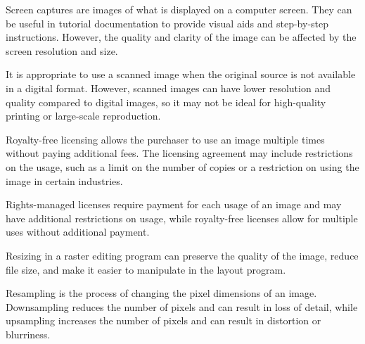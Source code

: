 \documentclass{report}
\begin{document}
    \bigbreak \noindent \bigbreak \noindent 
    \bigbreak \noindent 
    \bigbreak \noindent 
    Screen captures are images of what is displayed on a computer screen. They can be useful in tutorial documentation to provide visual aids and step-by-step instructions. However, the quality and clarity of the image can be affected by the screen resolution and size.

    \bigbreak \noindent \bigbreak \noindent 
    \bigbreak \noindent 
    \bigbreak \noindent 
    It is appropriate to use a scanned image when the original source is not available in a digital format. However, scanned images can have lower resolution and quality compared to digital images, so it may not be ideal for high-quality printing or large-scale reproduction.

    \bigbreak \noindent \bigbreak \noindent 
    \bigbreak \noindent 
    \bigbreak \noindent 
    Royalty-free licensing allows the purchaser to use an image multiple times without paying additional fees. The licensing agreement may include restrictions on the usage, such as a limit on the number of copies or a restriction on using the image in certain industries.

    \bigbreak \noindent \bigbreak \noindent 
    \bigbreak \noindent 
    \bigbreak \noindent 
    Rights-managed licenses require payment for each usage of an image and may have additional restrictions on usage, while royalty-free licenses allow for multiple uses without additional payment.


    \bigbreak \noindent \bigbreak \noindent 
    \bigbreak \noindent 
    \bigbreak \noindent 
    Resizing in a raster editing program can preserve the quality of the image, reduce file size, and make it easier to manipulate in the layout program.

    \bigbreak \noindent \bigbreak \noindent 
    \bigbreak \noindent 
    \bigbreak \noindent 
    Resampling is the process of changing the pixel dimensions of an image. Downsampling reduces the number of pixels and can result in loss of detail, while upsampling increases the number of pixels and can result in distortion or blurriness.
\end{document}
